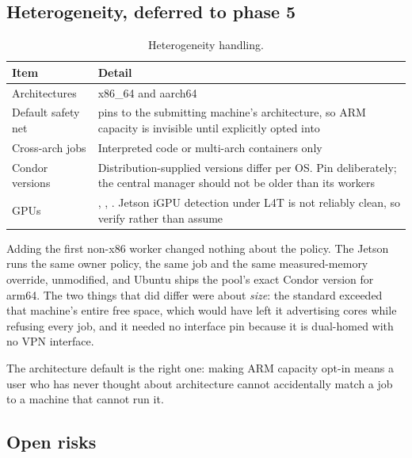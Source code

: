 \subsection{Heterogeneity, deferred to phase 5}

\begin{table}[H]
\centering
\begin{tabularx}{\textwidth}{L{0.24\textwidth} Y}
\toprule
\textbf{Item} & \textbf{Detail} \\
\midrule
Architectures & x86\_64 and aarch64 \\
Default safety net &  pins  to the submitting machine's architecture, so ARM capacity is invisible until explicitly opted into \\
Cross-arch jobs & Interpreted code or multi-arch containers only \\
Condor versions & Distribution-supplied versions differ per OS. Pin deliberately; the central manager should not be older than its workers \\
GPUs & , , . Jetson iGPU detection under L4T is not reliably clean, so verify rather than assume \\
\bottomrule
\end{tabularx}
\caption{Heterogeneity handling.}
\end{table}

\begin{keypoint}
Adding the first non-x86 worker changed nothing about the policy. The Jetson
runs the same owner policy, the same  job and the same
measured-memory override, unmodified, and Ubuntu ships the pool's exact Condor
version for arm64. The two things that did differ were about \emph{size}: the
standard  exceeded that machine's entire free space, which
would have left it advertising cores while refusing every job, and it needed no
interface pin because it is dual-homed with no VPN interface.
\end{keypoint}

The architecture default is the right one: making ARM capacity opt-in means a
user who has never thought about architecture cannot accidentally match a job to
a machine that cannot run it.

\subsection{Open risks}

